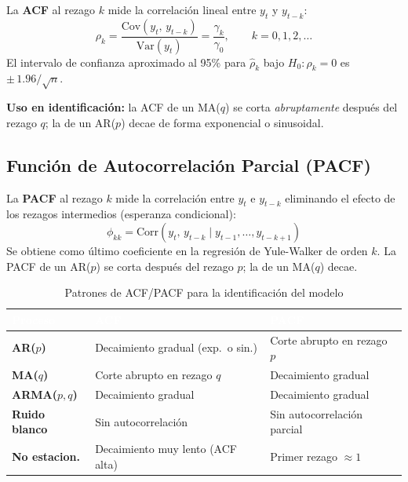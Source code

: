 \documentclass[12pt,a4paper]{article}
\begin{document}
La \textbf{ACF} al rezago $k$ mide la correlaci\'{o}n lineal entre $y_t$ y
$y_{t-k}$:
\begin{equation}
  \rho_k = \frac{\text{Cov}(y_t,\,y_{t-k})}{\text{Var}(y_t)}
  = \frac{\gamma_k}{\gamma_0}, \qquad k=0,1,2,\ldots
\end{equation}
El intervalo de confianza aproximado al 95\% para $\hat\rho_k$ bajo $H_0:\rho_k=0$
es $\pm\,1.96/\sqrt{n}$.

\textbf{Uso en identificaci\'{o}n:}
la ACF de un MA($q$) se corta \emph{abruptamente} despu\'{e}s del rezago $q$; la
de un AR($p$) decae de forma exponencial o sinusoidal.

\subsection{Funci\'{o}n de Autocorrelaci\'{o}n Parcial (PACF)}

La \textbf{PACF} al rezago $k$ mide la correlaci\'{o}n entre $y_t$ e $y_{t-k}$
eliminando el efecto de los rezagos intermedios (esperanza condicional):
\begin{equation}
  \phi_{kk} = \text{Corr}(y_t,\,y_{t-k}\mid y_{t-1},\ldots,y_{t-k+1})
\end{equation}
Se obtiene como \'{u}ltimo coeficiente en la regresi\'{o}n de Yule-Walker de orden $k$.
La PACF de un AR($p$) se corta despu\'{e}s del rezago $p$; la de un MA($q$)
decae.

\begin{table}[H]
  \centering
  \caption{Patrones de ACF/PACF para la identificaci\'{o}n del modelo}
  \label{tab:patterns}
  \begin{tabular}{>{\bfseries}l p{5cm} p{5cm}}
    \toprule
    \rowcolor{upnavy}
    \textcolor{white}{Proceso} & \textcolor{white}{ACF} & \textcolor{white}{PACF} \\
    \midrule
    AR($p$)    & Decaimiento gradual (exp.\ o sin.) & Corte abrupto en rezago $p$ \\
    MA($q$)    & Corte abrupto en rezago $q$        & Decaimiento gradual \\
    ARMA($p,q$)& Decaimiento gradual                & Decaimiento gradual \\
    Ruido blanco & Sin autocorrelaci\'{o}n            & Sin autocorrelaci\'{o}n parcial \\
    No estacion. & Decaimiento muy lento (ACF alta)  & Primer rezago $\approx 1$ \\
    \bottomrule
  \end{tabular}
\end{table}
\end{document}
